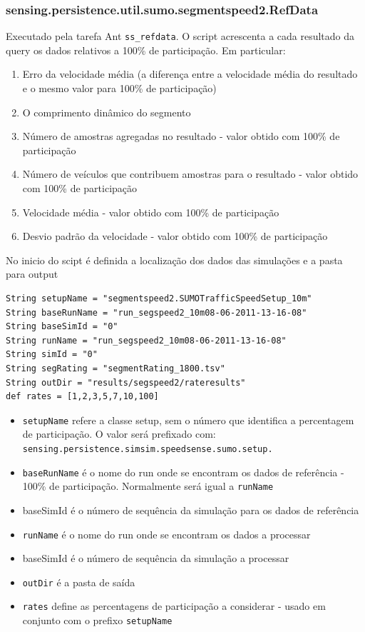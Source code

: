 \documentclass{article}
\newcommand{\tm}[1]{\texttt{#1}}
\begin{document}
\subsubsection{sensing.persistence.util.sumo.segmentspeed2.RefData}\label{sec:refdata}
Executado pela tarefa Ant \tm{ss\_refdata}. O script acrescenta a cada resultado da query os dados relativos a 100\% de participação. Em particular:

\begin{enumerate}
\item Erro da velocidade média (a diferença entre a velocidade média do resultado e o mesmo valor para 100\% de participação)
\item O comprimento dinâmico do segmento
\item Número de amostras agregadas no resultado - valor obtido com 100\% de participação
\item Número de veículos que contribuem amostras para o resultado - valor obtido com 100\% de participação
\item Velocidade média - valor obtido com 100\% de participação
\item Desvio padrão da velocidade - valor obtido com 100\% de participação
\end{enumerate}

No inicio do scipt é definida a localização dos dados das simulações e a pasta para output

\begin{Verbatim}
String setupName = "segmentspeed2.SUMOTrafficSpeedSetup_10m"
String baseRunName = "run_segspeed2_10m08-06-2011-13-16-08" 
String baseSimId = "0"
String runName = "run_segspeed2_10m08-06-2011-13-16-08"
String simId = "0"
String segRating = "segmentRating_1800.tsv"
String outDir = "results/segspeed2/rateresults"
def rates = [1,2,3,5,7,10,100]
\end{Verbatim}

\begin{itemize}
\item \tm{setupName} refere a classe setup, sem o número que identifica a percentagem de participação. O valor será prefixado com:
\tm{sensing.persistence.simsim.speedsense.sumo.setup.}
\item \tm{baseRunName} é o nome do run onde se encontram os dados de referência - 100\% de participação. Normalmente será igual a \tm{runName}
\item{baseSimId} é o número de sequência da simulação para os dados de referência
\item \tm{runName} é o nome do run onde se encontram os dados a processar
\item{baseSimId} é o número de sequência da simulação a processar
\item \tm{outDir} é a pasta de saída
\item \tm{rates} define as percentagens de participação a considerar - usado em conjunto com o prefixo \tm{setupName}
\end{itemize}
\end{document}
